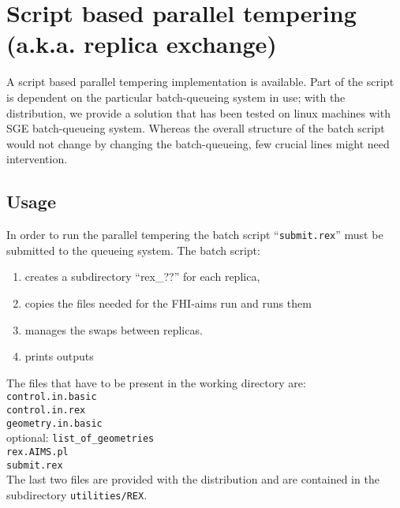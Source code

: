 
\section{Script based parallel tempering (a.k.a. replica exchange)}
\label{appendix_rex}

A script based parallel tempering implementation is available. Part of the script is dependent on the particular batch-queueing system in use; with the distribution, we provide a solution that has been tested on linux machines with SGE batch-queueing system. Whereas the overall structure of the batch script would not change by changing the batch-queueing, few crucial lines might need intervention.\\

\subsection{Usage}
In order to run the parallel tempering the batch script ``\texttt{submit.rex}'' must be submitted to the queueing system. The batch script:

\begin{enumerate}
 \item creates a subdirectory ``rex\_??'' for each replica, 
 \item copies the files needed for the FHI-aims run and runs them
 \item manages the swaps between replicas.
 \item prints outputs
\end{enumerate}

The files that have to be present in the working directory are:\\
\texttt{control.in.basic\\
control.in.rex\\
geometry.in.basic\\}
optional: \texttt{list\_of\_geometries\\
rex.AIMS.pl\\
submit.rex\\}
The last two files are provided with the distribution and are contained in the subdirectory \texttt{utilities/REX}.

